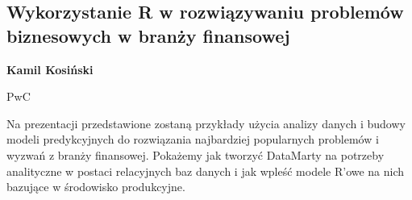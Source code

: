 \documentclass[\main/boa.tex]{subfiles}
\begin{document}
\subsection{Wykorzystanie R w rozwiązywaniu problemów biznesowych w branży finansowej}

\begin{minipage}{0.915\textwidth}
	\centering
  {\bf {}  Kamil Kosiński}
\end{minipage}


\begin{affiliations}
\begin{minipage}{0.915\textwidth}
\centering
PwC \\[-2pt]
\end{minipage}
\end{affiliations}

\vskip 0.3cm

  Na prezentacji przedstawione zostaną przykłady użycia analizy danych i budowy modeli predykcyjnych do rozwiązania najbardziej popularnych problemów i wyzwań z branży finansowej. Pokażemy jak tworzyć DataMarty na potrzeby analityczne w postaci relacyjnych baz danych i jak wpleść modele R'owe na nich bazujące w środowisko produkcyjne. 
\end{document}

